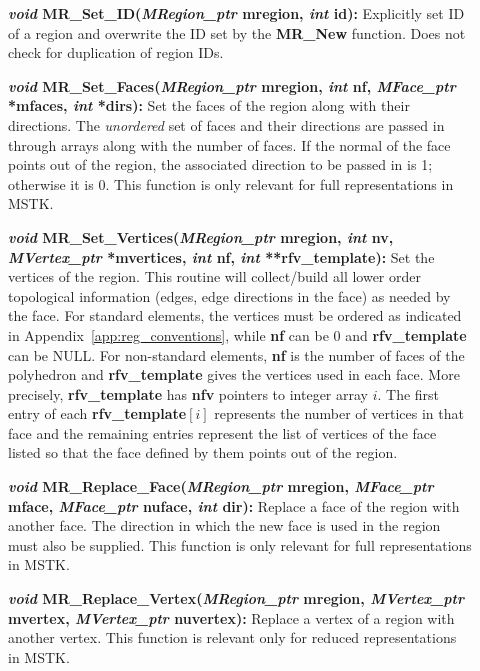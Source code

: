 \documentclass[12pt]{article}
\begin{document}
\begin{description}
\item[]{\bf {\em void} MR\_Set\_ID({\em MRegion\_ptr}
    mregion, {\em int} id):} Explicitly set ID of a region and
  overwrite the ID set by the {\bf MR\_New} function. Does not
  check for duplication of region IDs.
  
\item[]{\bf {\em void} MR\_Set\_Faces({\em MRegion\_ptr}
    mregion, {\em int} nf, {\em MFace\_ptr} *mfaces,
    {\em int} *dirs):} Set the faces of the region along with their
  directions. The {\em unordered} set of faces and their directions
  are passed in through arrays along with the number of faces. If the
  normal of the face points out of the region, the associated
  direction to be passed in is 1; otherwise it is 0. This function is
  only relevant for full representations in MSTK.
  
\item[]{\bf {\em void} MR\_Set\_Vertices({\em MRegion\_ptr}
    mregion, {\em int} nv, {\em MVertex\_ptr} *mvertices, 
    {\em int} nf, {\em int} **rfv\_template):} Set
  the vertices of the region. This routine will collect/build all
  lower order topological information (edges, edge directions in the
  face) as needed by the face. For standard elements, the vertices
  must be ordered as indicated in Appendix~\ref{app:reg_conventions},
  while {\bf nf} can be 0 and {\bf rfv\_template} can be NULL.
  For non-standard elements, {\bf nf} is the number of faces of the
  polyhedron and {\bf rfv\_template} gives the vertices used in each
  face. More precisely, {\bf rfv\_template} has {\bf nfv}
  pointers to integer array $i$. The first entry of each
  {\bf rfv\_template$[i]$} represents the number of vertices in that
  face and the remaining entries represent the list of vertices of the
  face listed so that the face defined by them points out of the region.
  
\item[]{\bf {\em void} MR\_Replace\_Face({\em MRegion\_ptr}
    mregion, {\em MFace\_ptr} mface, {\em MFace\_ptr} nuface,
    {\em int} dir):} Replace a face of the region with another
  face. The direction in which the new face is used in the region must
  also be supplied. This function is only relevant for full
  representations in MSTK.
  
\item[]{\bf {\em void} MR\_Replace\_Vertex({\em MRegion\_ptr}
    mregion, {\em MVertex\_ptr} mvertex, {\em MVertex\_ptr}
    nuvertex):} Replace a vertex of a region with another vertex. This
  function is relevant only for reduced representations in MSTK.
  

\end{description}
\end{document}

